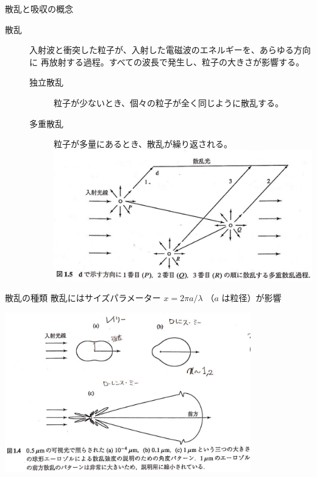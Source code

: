 \documentclass[unicode,colorlinks]{beamer}
\newcommand{\centeralign}[1]{\rule{0pt}{0pt}\hfill#1\hfill\rule{0pt}{0pt}}
\begin{document}
\begin{frame}{散乱と吸収の概念}
	\begin{description}
		\item[散乱] 入射波と衝突した粒子が、入射した電磁波のエネルギーを、あらゆる方向に
			再放射する過程。すべての波長で発生し、粒子の大きさが影響する。
			\begin{description}
				\item[独立散乱] 粒子が少ないとき、個々の粒子が全く同じように散乱する。
				\item[多重散乱] 粒子が多量にあるとき、散乱が繰り返される。\\
					\includegraphics[width=\linewidth]{mscatter.jpg}
			\end{description}
	\end{description}
\end{frame}

\begin{frame}{散乱の種類}
	散乱にはサイズパラメーター $x=2\pi a/\lambda$ （$a$ は粒径）が影響

	\centeralign{\includegraphics[width=0.8\textwidth]{scatter.jpg}}
\end{frame}
\end{document}
